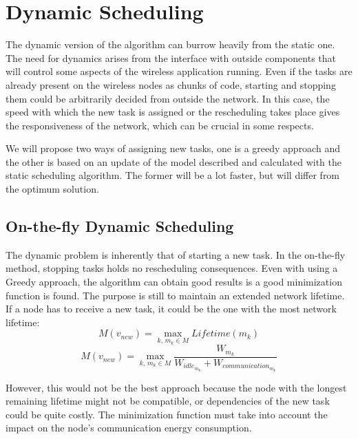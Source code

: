 \normalfont\normalsize
\chapter{Dynamic Scheduling}

The dynamic version of the algorithm can burrow heavily from the static one. The need for dynamics arises from the interface
with outside components that will control some aspects of the wireless application running. Even if the tasks are already present
on the wireless nodes as chunks of code, starting and stopping them could be arbitrarily decided from outside the network.
In this case, the speed with which the new task is assigned or the rescheduling takes place gives the responsiveness of the network,
which can be crucial in some respects.

We will propose two ways of assigning new tasks, one is a greedy approach and the other is based on an update of the model 
described and calculated with the static scheduling algorithm. The former will be a lot faster, but will differ from the
optimum solution.

\section{On-the-fly Dynamic Scheduling}

The dynamic problem is inherently that of starting a new task. In the on-the-fly method, stopping tasks holds no rescheduling
consequences. Even with using a Greedy approach, the algorithm can obtain good results is a good minimization function is found.
The purpose is still to maintain an extended network lifetime. If a node has to receive a new task, it could be the one with the most
network lifetime:
\begin{equation}
 M(v_{new}) = \max_{k,\,m_k\in M} Lifetime(m_k) 
\end{equation}
\begin{equation}
 M(v_{new}) = \max_{k,\,m_k\in M} \frac{W_{m_k}}{\displaystyle W_{idle_{m_k}} +  W_{communication_{m_k}}}
\end{equation}

However, this would not be the best approach because the node with the longest remaining lifetime might not be compatible, or dependencies
of the new task could be quite costly. The minimization function must take into account the impact on the node's communication energy 
consumption.

